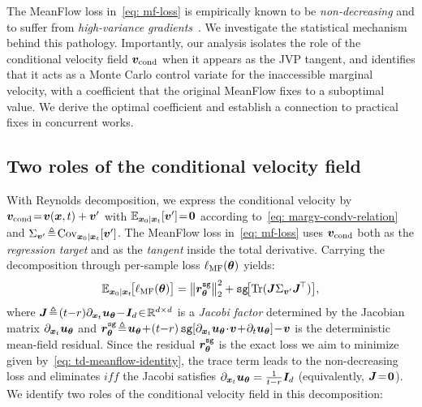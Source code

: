The MeanFlow loss in~\eqref{eq: mf-loss} is empirically known to be \textit{non-decreasing} and to suffer from \textit{high-variance gradients}~\cite{zhang2025alphaflowunderstandingimprovingmeanflow,geng2025improvedmeanflowschallenges}. We investigate the statistical mechanism behind this pathology. Importantly, our analysis isolates the role of the conditional velocity field ${\bm{v}}_{\text{cond}}$ when it appears as the JVP tangent, and identifies that it acts as a Monte Carlo control variate for the inaccessible marginal velocity, with a coefficient that the original MeanFlow fixes to a suboptimal value. We derive the optimal coefficient and establish a connection to practical fixes in concurrent works.

\subsection{Two roles of the conditional velocity field}
\label{subsec: two-roles}

With Reynolds decomposition, we express the conditional velocity by ${\bm{v}}_{\text{cond}}\!=\!{\bm{v}}({\bm{x}},t)+{\bm{v}}^{\prime}$ with $\mathbb{E}_{{\bm{x}}_{0}\mid{\bm{x}}_{t}}[{\bm{v}}^{\prime}]\!=\!\bm{0}$ according to~\eqref{eq: margv-condv-relation} and $\Sigma_{{\bm{v}}^{\prime}}\!\triangleq\!\mathrm{Cov}_{{\bm{x}}_{0}\mid{\bm{x}}_{t}}[{\bm{v}}^{\prime}]$. The MeanFlow loss in~\eqref{eq: mf-loss} uses ${\bm{v}}_{\text{cond}}$ both as the \textit{regression target} and as the \textit{tangent} inside the total derivative. Carrying the decomposition through per-sample loss $\ell_{\text{MF}}({\bm{\theta}})$ yields:
\begin{equation}
    \mathbb{E}_{{\bm{x}}_{0}\mid{\bm{x}}_{t}}\!\bigl[\ell_{\text{MF}}({\bm{\theta}})\bigr]
    =\bigl\|{\bm{r}}_{{\bm{\theta}}}^{\texttt{sg}}\bigr\|^{2}_{2}
    +\texttt{sg}\!\bigl[\operatorname{Tr}({\bm{J}}\Sigma_{{\bm{v}}^{\prime}}{\bm{J}}^{\!\top})\bigr],
    \label{eq: per-sample-expand}
\end{equation}
where ${\bm{J}}\!\triangleq\!(t{-}r)\partial_{{\bm{x}}_{t}}{\bm{u}}_{{\bm{\theta}}}\!-\!{\bm{I}}_{d}\!\in\!\mathbb{R}^{d\times d}$ is a \textit{Jacobi factor} determined by the Jacobian matrix $\partial_{{\bm{x}}_{t}}{\bm{u}}_{{\bm{\theta}}}$ and $\vr_{\vtheta}^{\texttt{sg}}\!\triangleq\!\vu_{\vtheta}\!+\!(t{-}r)\,\texttt{sg}[\partial_{\vx_{t}}\vu_{\vtheta}\!\cdot\!\vv\!+\!\partial_{t}\vu_{\vtheta}]\!-\!\vv$ is the deterministic mean-field residual. Since the residual ${\bm{r}}_{{\bm{\theta}}}^{\texttt{sg}}$ is the exact loss we aim to minimize given by~\eqref{eq: td-meanflow-identity}, the trace term leads to the non-decreasing loss and eliminates $\textit{iff}$ the Jacobi satisfies $\partial_{{\bm{x}}_{t}}{\bm{u}}_{{\bm{\theta}}}=\frac{1}{t-r}{\bm{I}}_{d}$ (equivalently, ${\bm{J}}\!=\!\bm{0}$). We identify two roles of the conditional velocity field in this decomposition:

